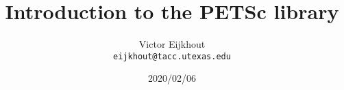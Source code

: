 \documentclass[11pt]{beamer}
\begin{document}
\title{Introduction to the PETSc library}
\author{Victor Eijkhout\\
\tt\normalsize eijkhout@tacc.utexas.edu}
\date{2020/02/06}
\frame{\titlepage}


\begin{xsede}
  
\end{xsede}












\begin{longversion}
  
  
\end{longversion}


\end{document}
